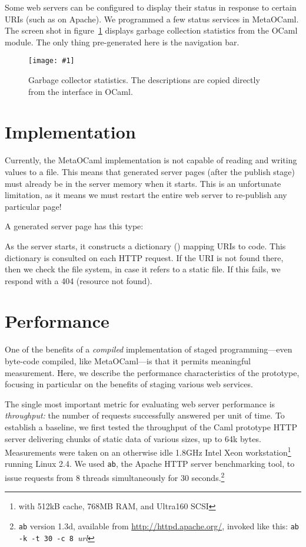 \documentclass[preprint]{acm_proc_article-sp}
\def\MOC{MetaOCaml\xspace}
\newcommand{\myfig}[3]{%
  \begin{figure}[tbp]%
    #3%
    \caption{#2}%
    \label{fig:#1}%
  \end{figure}}
\newcommand{\screenshot}[2]{%
  \myfig{#1}{#2}
  {\centering%
    \texttt{[image: \#1]}}}
\begin{document}
Some web servers can be configured to display their status in response
to certain URIs (such as  on Apache).  We
programmed a few status services in \MOC.  The screen shot in
figure~\ref{fig:gc} displays garbage collection statistics from the
OCaml  module.  The only thing pre-generated here is the
navigation bar.

\screenshot{gc}{Garbage collector statistics.  The descriptions are
  copied directly from the \id{gc.mli} interface in OCaml.}


\section{Implementation}
\label{sec:impl}


Currently, the \MOC implementation is not capable of reading
and writing  values to a file.  This means that
generated server pages (after the publish stage) must already be
in the server memory when it starts.  This is an unfortunate
limitation, as it means we must restart the entire web server to
re-publish any particular page!

A generated server page has this type:


As the server starts, it constructs a dictionary () mapping URIs to code.  This dictionary is
consulted on each HTTP request.  If the URI is not found there,
then we check the file system, in case it refers to a static
file.  If this fails, we respond with a 404 (resource not
found).


\section{Performance}
\label{sec:perf}
One of the benefits of a \emph{compiled} implementation of staged
programming---even byte-code compiled, like \MOC---is that it permits
meaningful measurement.  Here, we describe the performance
characteristics of the prototype, focusing in particular on the
benefits of staging various web services.

The single most important metric for evaluating web server performance
is \textit{throughput:} the number of requests successfully answered
per unit of time.  To establish a baseline, we first tested the
throughput of the Caml prototype HTTP server delivering chunks of
static data of various sizes, up to 64k bytes.
Measurements were taken on an otherwise idle 1.8GHz Intel
Xeon\texttrademark{} workstation\footnote{with 512kB cache, 768MB RAM,
  and Ultra160 SCSI} running Linux 2.4.  We used \texttt{ab},
the Apache HTTP server benchmarking tool, to issue requests
from 8 threads simultaneously for 30 seconds.\footnote{\texttt{ab}
  version 1.3d, available from \url{http://httpd.apache.org/}, 
  invoked like this:
  \texttt{ab -k -t 30 -c 8 }\textit{url}}
\end{document}
